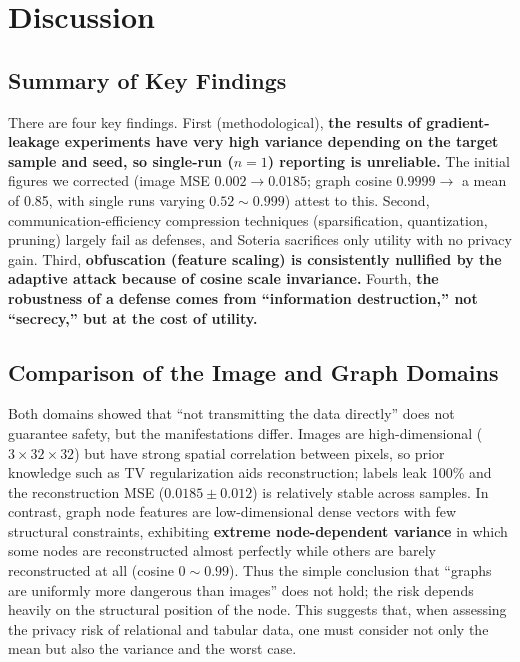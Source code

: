 \documentclass[conference]{IEEEtran}
\begin{document}
\section{Discussion}

\subsection{Summary of Key Findings}
There are four key findings. First (methodological), \textbf{the results of
gradient-leakage experiments have very high variance depending on the target
sample and seed, so single-run ($n{=}1$) reporting is unreliable.} The initial
figures we corrected (image MSE $0.002\to0.0185$; graph cosine $0.9999\to$ a mean
of 0.85, with single runs varying $0.52\sim0.999$) attest to this. Second,
communication-efficiency compression techniques (sparsification, quantization,
pruning) largely fail as defenses, and Soteria sacrifices only utility with no
privacy gain. Third, \textbf{obfuscation (feature scaling) is consistently
nullified by the adaptive attack because of cosine scale invariance.} Fourth,
\textbf{the robustness of a defense comes from ``information destruction,'' not
``secrecy,'' but at the cost of utility.}

\subsection{Comparison of the Image and Graph Domains}
Both domains showed that ``not transmitting the data directly'' does not
guarantee safety, but the manifestations differ. Images are
high-dimensional ($3{\times}32{\times}32$) but have strong spatial correlation
between pixels, so prior knowledge such as TV regularization aids reconstruction;
labels leak 100\% and the reconstruction MSE ($0.0185\pm0.012$) is relatively
stable across samples. In contrast, graph node features are low-dimensional dense
vectors with few structural constraints, exhibiting \textbf{extreme node-dependent
variance} in which some nodes are reconstructed almost perfectly while others are
barely reconstructed at all (cosine $0\sim0.99$). Thus the simple conclusion that
``graphs are uniformly more dangerous than images'' does not hold; the risk
depends heavily on the structural position of the node. This suggests that, when
assessing the privacy risk of relational and tabular data, one must consider not
only the mean but also the variance and the worst case.
\end{document}
